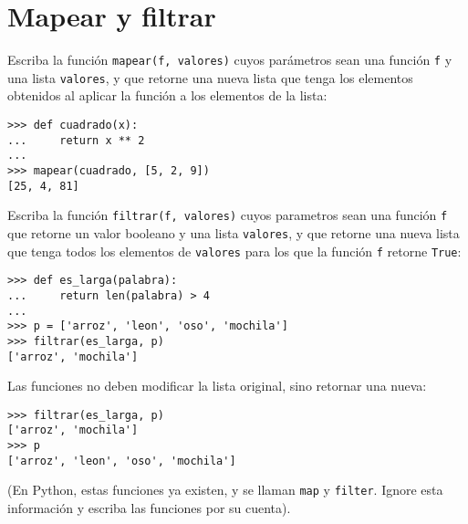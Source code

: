 \section{Mapear y filtrar}

Escriba la función \lstinline!mapear(f, valores)! cuyos parámetros sean
una función \lstinline!f! y una lista \lstinline!valores!, y que retorne
una nueva lista que tenga los elementos obtenidos al aplicar la función
a los elementos de la lista:

\begin{lstlisting}
>>> def cuadrado(x):
...     return x ** 2
...
>>> mapear(cuadrado, [5, 2, 9])
[25, 4, 81]
\end{lstlisting}

Escriba la función \lstinline!filtrar(f, valores)! cuyos parametros sean
una función \lstinline!f! que retorne un valor booleano y una lista
\lstinline!valores!, y que retorne una nueva lista que tenga todos los
elementos de \lstinline!valores! para los que la función \lstinline!f!
retorne \lstinline!True!:

\begin{lstlisting}
>>> def es_larga(palabra):
...     return len(palabra) > 4
...
>>> p = ['arroz', 'leon', 'oso', 'mochila']
>>> filtrar(es_larga, p)
['arroz', 'mochila']
\end{lstlisting}

Las funciones no deben modificar la lista original, sino retornar una
nueva:

\begin{lstlisting}
>>> filtrar(es_larga, p)
['arroz', 'mochila']
>>> p
['arroz', 'leon', 'oso', 'mochila']
\end{lstlisting}

(En Python, estas funciones ya existen, y se llaman \lstinline!map! y
\lstinline!filter!. Ignore esta información y escriba las funciones por
su cuenta).

